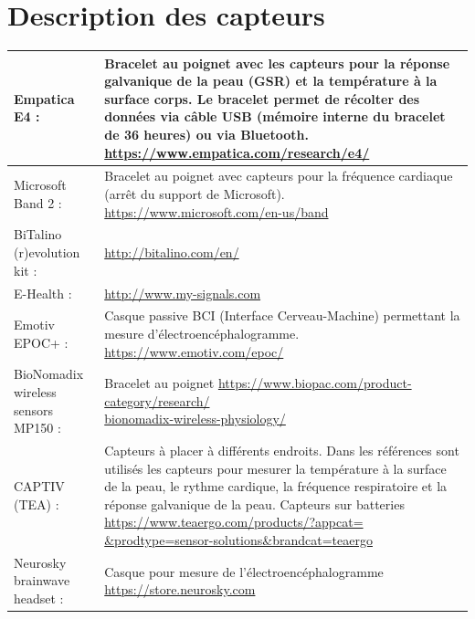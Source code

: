 \documentclass[11pt]{article}
\begin{document}
\newpage
\section{Description des capteurs}\label{ann:capteurs}
	\begin{table}[h]
		\begin{tabular}{|p{5cm}|p{10cm}|}
		\hline
		Empatica E4 : & Bracelet au poignet avec les capteurs pour la réponse galvanique de la peau (GSR) et la température à la surface corps.
		Le bracelet permet de récolter des données via câble USB (mémoire interne du bracelet de 36 heures) ou via Bluetooth.\newline
		\href{https://www.empatica.com/research/e4/}{https://www.empatica.com/research/e4/}\\\hline
		Microsoft Band 2 :& Bracelet au poignet avec capteurs pour la fréquence cardiaque (arrêt du support de Microsoft).
		\newline \href{https://www.microsoft.com/en-us/band}{https://www.microsoft.com/en-us/band}\\\hline
		BiTalino (r)evolution kit :&
		\newline \href{http://bitalino.com/en/}{http://bitalino.com/en/}\\\hline
		E-Health :& \newline \href{http://www.my-signals.com}{http://www.my-signals.com}\\\hline
		Emotiv EPOC+ :& Casque passive BCI (Interface Cerveau-Machine) permettant la mesure d'électroencéphalogramme.
		\newline \href{https://www.emotiv.com/epoc/}{https://www.emotiv.com/epoc/}\\\hline
		BioNomadix wireless sensors MP150 :& Bracelet au poignet
		\newline \href{https://www.biopac.com/product-category/research/bionomadix-wireless-physiology/}{https://www.biopac.com/product-category/research/\newline bionomadix-wireless-physiology/}\\\hline
		CAPTIV (TEA) :& Capteurs à placer à différents endroits.
		Dans les références sont utilisés les capteurs pour mesurer la température à la surface de la peau, le rythme cardique, la fréquence respiratoire et la réponse galvanique de la peau.
		Capteurs sur batteries
		\newline \href{https://www.teaergo.com/products/?appcat=&prodtype=sensor-solutions&brandcat=teaergo}{https://www.teaergo.com/products/?appcat=\newline \&prodtype=sensor-solutions\&brandcat=teaergo}\\\hline
        Neurosky brainwave headset :& Casque pour mesure de l'électroencéphalogramme
        \newline \href{https://store.neurosky.com}{https://store.neurosky.com}\\
		\hline
		\end{tabular}
		\label{tab:capteurs}
	\end{table}
\end{document}

